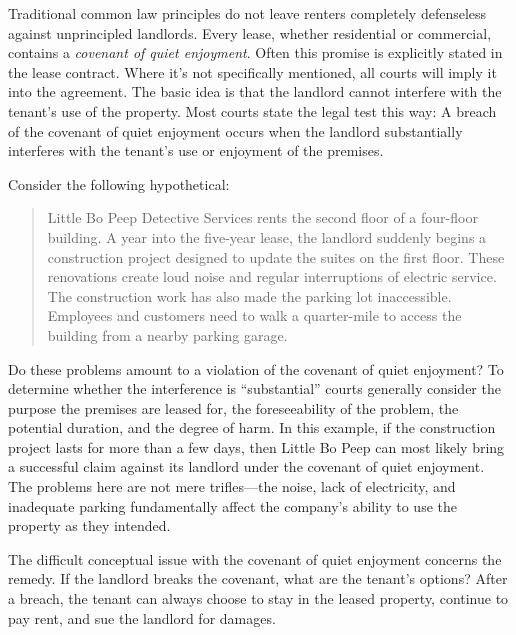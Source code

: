 Traditional common law principles do not leave renters completely defenseless
against unprincipled landlords.  Every lease, whether residential or
commercial, contains a \textit{covenant of quiet enjoyment}.  Often this
promise is explicitly stated in the lease contract.  Where it's not
specifically mentioned, all courts will imply it into the agreement.  The basic
idea is that the landlord cannot interfere with the tenant's use of the
property.  Most courts state the legal test this way: A breach of the covenant
of quiet enjoyment occurs when the landlord substantially interferes with the
tenant's use or enjoyment of the premises.  

Consider the following hypothetical: 
\begin{quote}\edfont
Little Bo Peep Detective Services rents the second floor of a four-floor
building.  A year into the five-year lease, the landlord suddenly begins a
construction project designed to update the suites on the first floor.  These
renovations create loud noise and regular interruptions of electric service.
The construction work has also made the parking lot inaccessible.  Employees
and customers need to walk a quarter-mile to access the building from a nearby
parking garage.  
\end{quote}
Do these problems amount to a violation of the covenant of quiet enjoyment?  To
determine whether the interference is ``substantial'' courts generally consider
the purpose the premises are leased for, the foreseeability of the problem, the
potential duration, and the degree of harm. In this example, if the
construction project lasts for more than a few days, then Little Bo Peep can
most likely bring a successful claim against its landlord under the covenant of
quiet enjoyment.  The problems here are not mere trifles---the noise, lack of
electricity, and inadequate parking fundamentally affect the company's ability
to use the property as they intended.  

The difficult conceptual issue with the covenant of quiet enjoyment concerns the
remedy.  If the landlord breaks the covenant, what are the tenant's options? 
After a breach, the tenant can always choose to stay in the leased property,
continue to pay rent, and sue the landlord for damages.  

